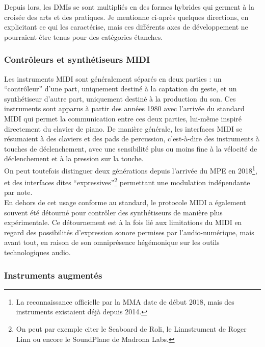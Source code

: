\noindent Depuis lors, les \glspl{DMI} se sont multipliés en des formes hybrides qui germent à la croisée des arts et des pratiques. Je mentionne ci-après quelques directions, en explicitant ce qui les caractérise, mais ces différents axes de développement ne pourraient être tenus pour des catégories étanches.

\subsubsection{Contrôleurs et synthétiseurs MIDI}

\noindent Les instruments \gls{MIDI} sont généralement séparés en deux parties : un ``contrôleur'' d'une part, uniquement destiné à la captation du geste, et un synthétiseur d'autre part, uniquement destiné à la production du son. Ces instruments sont apparus à partir des années 1980 avec l'arrivée du standard \gls{MIDI} qui permet la communication entre ces deux parties, lui-même inspiré directement du clavier de piano. De manière générale, les interfaces \gls{MIDI} se résumaient à des claviers et des pads de percussion, c'est-à-dire des instruments à touches de déclenchement, avec une sensibilité plus ou moins fine à la vélocité de déclenchement et à la pression sur la touche.\\
\indent On peut toutefois distinguer deux générations depuis l'arrivée du \gls{MPE} en 2018\footnote{La reconnaissance officielle par la \gls{MMA} date de début 2018, mais des instruments existaient déjà depuis 2014.}, et des interfaces dites ``expressives''\footnote{On peut par exemple citer le Seaboard de Roli, le Linnstrument de Roger Linn ou encore le SoundPlane de Madrona Labs.} permettant une modulation indépendante par note.\\
\indent En dehors de cet usage conforme au standard, le protocole \gls{MIDI} a également souvent été détourné pour contrôler des synthétiseurs de manière plus expérimentale. Ce détournement est à la fois lié aux limitations du \gls{MIDI} en regard des possibilités d'expression sonore permises par l'audio-numérique, mais avant tout, en raison de son omniprésence hégémonique sur les outils technologiques audio.

\subsubsection{Instruments augmentés}

